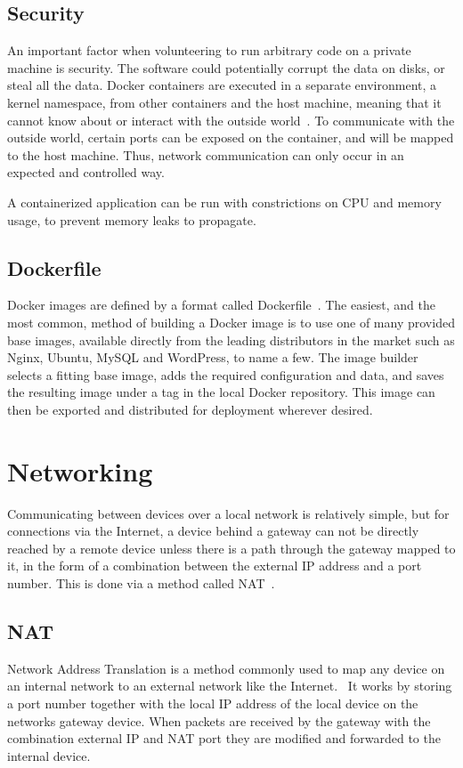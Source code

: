 \subsection{Security}
An important factor when volunteering to run arbitrary code on a private machine is security. The software could potentially corrupt the data on disks, or steal all the data. 
Docker containers are executed in a separate environment, a kernel namespace, from other containers and the host machine, meaning that it cannot know about or interact with the outside world~\cite{docker-security}. To communicate with the outside world, certain ports can be exposed on the container, and will be mapped to the host machine. Thus, network communication can only occur in an expected and controlled way. 

A containerized application can be run with constrictions on CPU and memory usage, to prevent memory leaks to propagate.

\subsection{Dockerfile}
Docker images are defined by a format called Dockerfile~\cite{docker-dockerfile}. The easiest, and the most common, method of building a Docker image is to use one of many provided base images, available directly from the leading distributors in the market such as Nginx, Ubuntu, MySQL and WordPress, to name a few. The image builder selects a fitting base image, adds the required configuration and data, and saves the resulting image under a tag in the local Docker repository. This image can then be exported and distributed for deployment wherever desired.

\section{Networking}
Communicating between devices over a local network is relatively simple, but for connections via the Internet, a device behind a gateway can not be directly reached by a remote device unless there is a path through the gateway mapped to it, in the form of a combination between the external IP address and a port number. This is done via a method called NAT~\cite{kurose:p349}. 

\subsection{NAT}
Network Address Translation is a method commonly used to map any device on an internal network to an external network like the Internet.~\cite{kurose:p349} It works by storing a port number together with the local IP address of the local device on the networks gateway device. When packets are received by the gateway with the combination external IP and NAT port they are modified and forwarded to the internal device.

